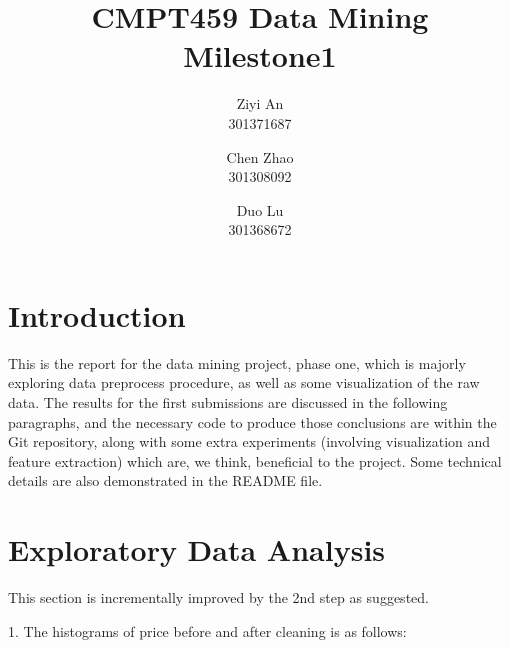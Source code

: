 \documentclass[10pt,twocolumn,letterpaper]{article}
\begin{document}
\title{CMPT459 Data Mining\\
Milestone1}


\author{Ziyi An\\
301371687\\
\and
Chen Zhao\\
301308092\\

\and

Duo Lu\\
301368672
}


\maketitle








\section{Introduction}
This is the report for the data mining project, phase one, which is majorly exploring data preprocess procedure, as well as some visualization of the raw data. The results for the first submissions are discussed in the following paragraphs, and the necessary code to produce those conclusions are within the Git repository, along with some extra experiments (involving visualization and feature extraction) which are, we think, beneficial to the project. Some technical details are also demonstrated in the README file.


\section{Exploratory Data Analysis}
This section is incrementally improved by the 2nd step as suggested. 

\-

1. The histograms of price before and after cleaning is as follows:   
\end{document}
